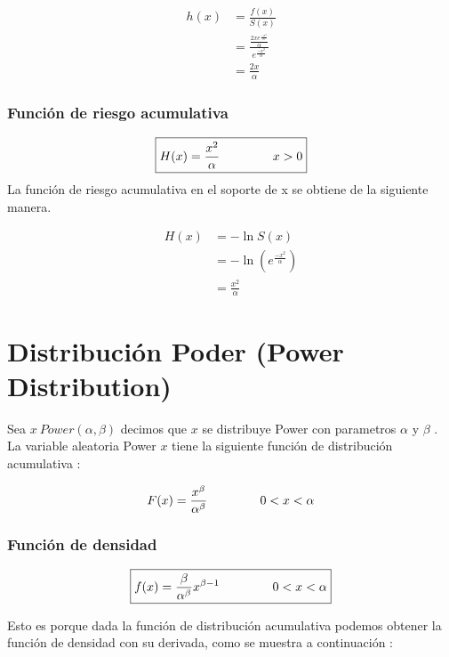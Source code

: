 \documentclass[10pt,a4paper]{article}
\begin{document}
\begin{align*}
h(x) &= \frac{f(x)}{S(x)} \\
     &= \frac{\frac{2x e^{\frac{-x^2}{\alpha}}}{\alpha}}{e^{\frac{-x^2}{\alpha}}} \\
     &= \frac{2x}{\alpha} 
\end{align*}


\subsubsection*{Funci\'on de riesgo acumulativa}
\begin{equation*}
\boxed{
H(x) = \frac{x^2}{\alpha} \hspace{1.5cm} x > 0}
\end{equation*}
La función de riesgo acumulativa en el soporte de x se obtiene de la siguiente manera.

\begin{align*}
H(x) &= -\ln S(x) \\
     &= - \ln \left( e^{\frac{-x^2}{\alpha}} \right)  \\
     &= \frac{x^2}{\alpha}
\end{align*}

\section{Distribuci\'on Poder (Power Distribution)}

Sea $ x ~ Power(\alpha,\beta) $ decimos que $x$ se distribuye Power con parametros $\alpha$ y $\beta$ . La variable aleatoria Power $x$ tiene la siguiente función de distribución acumulativa :

\begin{equation*}
	F(x) = \frac{x^\beta}{\alpha^\beta} \hspace{1.5cm} 0<x<\alpha
\end{equation*}


\subsubsection*{Funci\'on de densidad}

\begin{equation*}
\boxed{
f(x) = \frac{\beta}{\alpha^\beta} x^{\beta -1} \hspace{1.5cm} 0<x<\alpha}
\end{equation*}

Esto es porque dada la función de distribución acumulativa podemos obtener la función de densidad con su derivada, como se muestra a continuación : 
\end{document}
